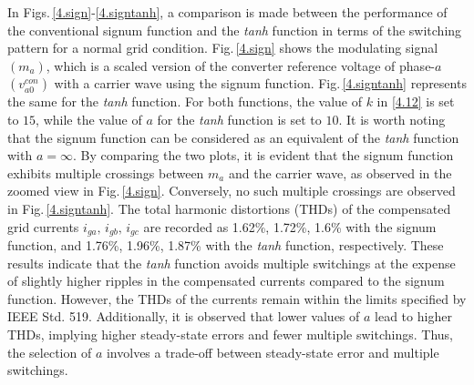 In Figs.\,\ref{4.sign}-\ref{4.signtanh}, a comparison is made between the performance of the conventional signum function and the \textit{tanh} function in terms of the switching pattern for a normal grid condition. Fig.\,\ref{4.sign} shows the modulating signal $(m_{a})$, which is a scaled version of the converter reference voltage of phase-$a$ $(v_{a0}^{con})$ with a carrier wave using the signum function. Fig.\,\ref{4.signtanh} represents the same for the \textit{tanh} function. For both functions, the value of $k$ in \eqref{4.12} is set to $15$, while the value of $a$ for the \textit{tanh} function is set to $10$. It is worth noting that the signum function can be considered as an equivalent of the \textit{tanh} function with $a = \infty$. By comparing the two plots, it is evident that the signum function exhibits multiple crossings between $m_{a}$ and the carrier wave, as observed in the zoomed view in Fig.\,\ref{4.sign}. Conversely, no such multiple crossings are observed in Fig.\,\ref{4.signtanh}. The total harmonic distortions (THDs) of the compensated grid currents $i_{ga},\,i_{gb},\,i_{gc}$ are recorded as 1.62\%, 1.72\%, 1.6\% with the signum function, and 1.76\%, 1.96\%, 1.87\% with the \textit{tanh} function, respectively. These results indicate that the \textit{tanh} function avoids multiple switchings at the expense of slightly higher ripples in the compensated currents compared to the signum function. However, the THDs of the currents remain within the limits specified by IEEE Std. 519. Additionally, it is observed that lower values of $a$ lead to higher THDs, implying higher steady-state errors and fewer multiple switchings. Thus, the selection of $a$ involves a trade-off between steady-state error and multiple switchings. 

